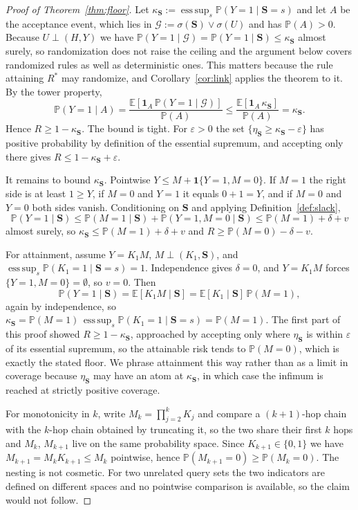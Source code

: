 \documentclass{article}
\newcommand{\esssup}{\operatorname*{ess\,sup}}
\newcommand{\gate}{\mathbf{S}}
\begin{document}
\begin{proof}[Proof of Theorem~\ref{thm:floor}]
Let $\kappa_{\gate}:=\esssup_s\mathbb{P}(Y=1\mid\gate=s)$ and let $A$ be the acceptance event, which
lies in $\mathcal{G}:=\sigma(\gate)\vee\sigma(U)$ and has $\mathbb{P}(A)>0$. Because
$U\perp(H,Y)$ we have $\mathbb{P}(Y=1\mid\mathcal{G})=\mathbb{P}(Y=1\mid\gate)\le\kappa_{\gate}$
almost surely, so randomization does not raise the ceiling and the argument below covers randomized
rules as well as deterministic ones. This matters because the rule attaining $R^\ast$ may randomize,
and Corollary~\ref{cor:link} applies the theorem to it. By the tower property,
\[
\mathbb{P}(Y=1\mid A)=\frac{\mathbb{E}[\mathbf{1}_A\,\mathbb{P}(Y=1\mid\mathcal{G})]}{\mathbb{P}(A)}
\le\frac{\mathbb{E}[\mathbf{1}_A\,\kappa_{\gate}]}{\mathbb{P}(A)}=\kappa_{\gate}.
\]
Hence $R\ge1-\kappa_{\gate}$. The bound is tight. For $\varepsilon>0$ the set
$\{\eta_{\gate}\ge\kappa_{\gate}-\varepsilon\}$ has positive probability by definition of the
essential supremum, and accepting only there gives $R\le1-\kappa_{\gate}+\varepsilon$.

It remains to bound $\kappa_{\gate}$. Pointwise $Y\le M+\mathbf{1}\{Y=1,M=0\}$. If $M=1$ the right
side is at least $1\ge Y$, if $M=0$ and $Y=1$ it equals $0+1=Y$, and if $M=0$ and $Y=0$ both sides
vanish. Conditioning on $\gate$ and applying Definition~\ref{def:slack},
\[
\mathbb{P}(Y=1\mid\gate)\le\mathbb{P}(M=1\mid\gate)+\mathbb{P}(Y=1,M=0\mid\gate)
\le\mathbb{P}(M=1)+\delta+v
\]
almost surely, so $\kappa_{\gate}\le\mathbb{P}(M=1)+\delta+v$ and
$R\ge\mathbb{P}(M=0)-\delta-v$.

For attainment, assume $Y=K_1M$, $M\perp(K_1,\gate)$, and
$\esssup_s\mathbb{P}(K_1=1\mid\gate=s)=1$. Independence gives $\delta=0$, and $Y=K_1M$ forces
$\{Y=1,M=0\}=\emptyset$, so $v=0$. Then
\[
\mathbb{P}(Y=1\mid\gate)=\mathbb{E}[K_1M\mid\gate]=\mathbb{E}[K_1\mid\gate]\,\mathbb{P}(M=1),
\]
again by independence, so
$\kappa_{\gate}=\mathbb{P}(M=1)\,\esssup_s\mathbb{P}(K_1=1\mid\gate=s)=\mathbb{P}(M=1)$. The first
part of this proof showed $R\ge1-\kappa_{\gate}$, approached by accepting only where
$\eta_{\gate}$ is within $\varepsilon$ of its essential supremum, so the attainable risk tends to
$\mathbb{P}(M=0)$, which is exactly the stated floor. We phrase attainment this way rather than as a
limit in coverage because $\eta_{\gate}$ may have an atom at $\kappa_{\gate}$, in which case the
infimum is reached at strictly positive coverage.

For monotonicity in $k$, write $M_k=\prod_{j=2}^{k}K_j$ and compare a $(k{+}1)$-hop chain with the
$k$-hop chain obtained by truncating it, so the two share their first $k$ hops and $M_k$, $M_{k+1}$
live on the same probability space. Since $K_{k+1}\in\{0,1\}$ we have $M_{k+1}=M_kK_{k+1}\le M_k$
pointwise, hence $\mathbb{P}(M_{k+1}=0)\ge\mathbb{P}(M_k=0)$. The nesting is not cosmetic. For two
unrelated query sets the two indicators are defined on different spaces and no pointwise comparison
is available, so the claim would not follow.
\end{proof}
\end{document}

